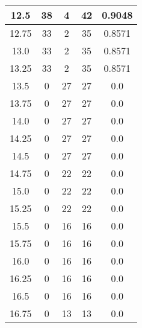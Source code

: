 \documentclass[letterpaper, 12pt]{article}
\begin{document}
\begin{longtable}{|c|c|c|c|c|}
12.5 & 38 & 4 & 42 & 0.9048 \\
\hline
12.75 & 33 & 2 & 35 & 0.8571 \\
\hline
13.0 & 33 & 2 & 35 & 0.8571 \\
\hline
13.25 & 33 & 2 & 35 & 0.8571 \\
\hline
13.5 & 0 & 27 & 27 & 0.0 \\
\hline
13.75 & 0 & 27 & 27 & 0.0 \\
\hline
14.0 & 0 & 27 & 27 & 0.0 \\
\hline
14.25 & 0 & 27 & 27 & 0.0 \\
\hline
14.5 & 0 & 27 & 27 & 0.0 \\
\hline
14.75 & 0 & 22 & 22 & 0.0 \\
\hline
15.0 & 0 & 22 & 22 & 0.0 \\
\hline
15.25 & 0 & 22 & 22 & 0.0 \\
\hline
15.5 & 0 & 16 & 16 & 0.0 \\
\hline
15.75 & 0 & 16 & 16 & 0.0 \\
\hline
16.0 & 0 & 16 & 16 & 0.0 \\
\hline
16.25 & 0 & 16 & 16 & 0.0 \\
\hline
16.5 & 0 & 16 & 16 & 0.0 \\
\hline
16.75 & 0 & 13 & 13 & 0.0 \\
\hline
\end{longtable}
\end{document}
